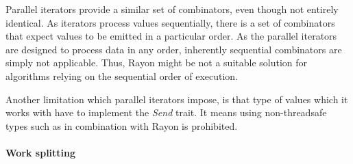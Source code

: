 Parallel iterators provide a similar set of combinators, even though not entirely identical. As iterators process values sequentially, there is a set of combinators that expect values to be emitted in a particular order. As the parallel iterators are designed to process data in any order, inherently sequential combinators are simply not applicable. Thus, Rayon might be not a suitable solution for algorithms relying on the sequential order of execution.

Another limitation which parallel iterators impose, is that type of values which it works with have to implement the \emph{Send} trait. It means using non-threadsafe types such as \rc{} in combination with Rayon is prohibited.

\paragraph{Work splitting}
